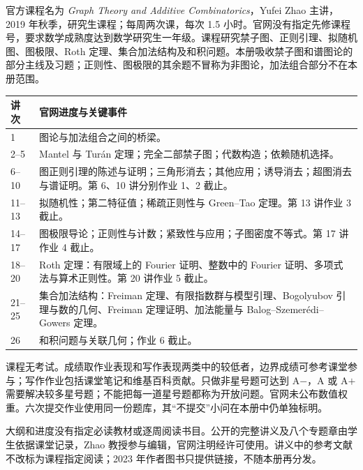 \par\addvspace{9pt}\par\nobreak\vspace{4pt}
官方课程名为 \textit{Graph Theory and Additive Combinatorics}，Yufei Zhao 主讲，2019 年秋季，研究生课程；每周两次课，每次 1.5 小时。官网没有指定先修课程号，要求数学成熟度达到数学研究生一年级。课程研究禁子图、正则引理、拟随机图、图极限、Roth 定理、集合加法结构及和积问题。本册吸收禁子图和谱图论的部分主线及习题；正则性、图极限的其余题不冒称为非图论，加法组合部分不在本册范围。
\begin{longtable}{p{}p{}}
\toprule 讲次 & 官网进度与关键事件\\\midrule\endhead
1 & 图论与加法组合之间的桥梁。\\
2--5 & Mantel 与 Turán 定理；完全二部禁子图；代数构造；依赖随机选择。\\
6--10 & 图正则引理的陈述与证明；三角形消去；其他应用；诱导消去；超图消去与谱证明。第 6、10 讲分别作业 1、2 截止。\\
11--13 & 拟随机性；第二特征值；稀疏正则性与 Green--Tao 定理。第 13 讲作业 3 截止。\\
14--17 & 图极限导论；正则性与计数；紧致性与应用；子图密度不等式。第 17 讲作业 4 截止。\\
18--20 & Roth 定理：有限域上的 Fourier 证明、整数中的 Fourier 证明、多项式法与算术正则性。第 20 讲作业 5 截止。\\
21--25 & 集合加法结构：Freiman 定理、有限指数群与模型引理、Bogolyubov 引理与数的几何、Freiman 定理证明、加法能量与 Balog--Szemerédi--Gowers 定理。\\
26 & 和积问题与关联几何；作业 6 截止。\\\bottomrule
\end{longtable}
课程无考试。成绩取作业表现和写作表现两类中的较低者，边界成绩可参考课堂参与；写作作业包括课堂笔记和维基百科贡献。只做非星号题可达到 A$-$，A 或 A$+$ 需要解决较多星号题；不能把每一道星号题都称为开放问题。官网未公布数值权重。六次提交作业使用同一份题库，其“不提交”小问在本册中仍单独标明。

大纲和进度没有指定必读教材或逐周阅读书目。公开的完整讲义及八个专题章由学生依据课堂记录，Zhao 教授参与编辑，官网注明经许可使用。讲义中的参考文献不改标为课程指定阅读；2023 年作者图书只提供链接，不随本册再分发。

